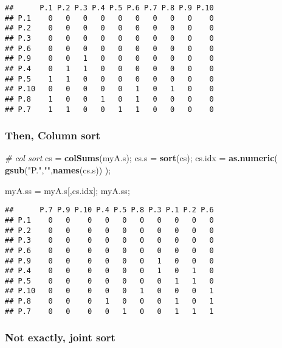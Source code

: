 \documentclass[
]{article}
\newenvironment{Shaded}{\begin{snugshade}}{\end{snugshade}}
\newcommand{\CommentTok}[1]{\textcolor[rgb]{0.56,0.35,0.01}{\textit{#1}}}
\newcommand{\KeywordTok}[1]{\textcolor[rgb]{0.13,0.29,0.53}{\textbf{#1}}}
\newcommand{\NormalTok}[1]{#1}
\newcommand{\StringTok}[1]{\textcolor[rgb]{0.31,0.60,0.02}{#1}}
\begin{document}
\begin{verbatim}
##      P.1 P.2 P.3 P.4 P.5 P.6 P.7 P.8 P.9 P.10
## P.1    0   0   0   0   0   0   0   0   0    0
## P.2    0   0   0   0   0   0   0   0   0    0
## P.3    0   0   0   0   0   0   0   0   0    0
## P.6    0   0   0   0   0   0   0   0   0    0
## P.9    0   0   1   0   0   0   0   0   0    0
## P.4    0   1   1   0   0   0   0   0   0    0
## P.5    1   1   0   0   0   0   0   0   0    0
## P.10   0   0   0   0   0   1   0   1   0    0
## P.8    1   0   0   1   0   1   0   0   0    0
## P.7    1   1   0   0   1   1   0   0   0    0
\end{verbatim}

\hypertarget{then-column-sort}{%
\subsubsection{Then, Column sort}\label{then-column-sort}}

\begin{Shaded}
\begin{Highlighting}[]
\CommentTok{\# col sort}
\NormalTok{cs =}\StringTok{ }\KeywordTok{colSums}\NormalTok{(myA.s);}
\NormalTok{cs.s =}\StringTok{ }\KeywordTok{sort}\NormalTok{(cs);}
\NormalTok{cs.idx =}\StringTok{ }\KeywordTok{as.numeric}\NormalTok{( }\KeywordTok{gsub}\NormalTok{(}\StringTok{"P."}\NormalTok{,}\StringTok{""}\NormalTok{,}\KeywordTok{names}\NormalTok{(cs.s)) );}

\NormalTok{myA.ss =}\StringTok{ }\NormalTok{myA.s[,cs.idx];}
\NormalTok{myA.ss;}
\end{Highlighting}
\end{Shaded}

\begin{verbatim}
##      P.7 P.9 P.10 P.4 P.5 P.8 P.3 P.1 P.2 P.6
## P.1    0   0    0   0   0   0   0   0   0   0
## P.2    0   0    0   0   0   0   0   0   0   0
## P.3    0   0    0   0   0   0   0   0   0   0
## P.6    0   0    0   0   0   0   0   0   0   0
## P.9    0   0    0   0   0   0   1   0   0   0
## P.4    0   0    0   0   0   0   1   0   1   0
## P.5    0   0    0   0   0   0   0   1   1   0
## P.10   0   0    0   0   0   1   0   0   0   1
## P.8    0   0    0   1   0   0   0   1   0   1
## P.7    0   0    0   0   1   0   0   1   1   1
\end{verbatim}

\hypertarget{not-exactly-joint-sort}{%
\subsubsection{Not exactly, joint sort}\label{not-exactly-joint-sort}}
\end{document}
